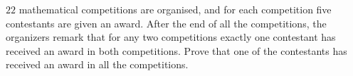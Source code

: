 $22$ mathematical competitions are organised, and for each competition five contestants are given an award. After the end of all the competitions, the organizers remark that for any two competitions exactly one contestant has received an award in both competitions. Prove that one of the contestants has received an award in all the competitions.
